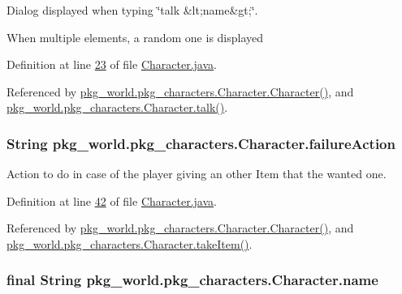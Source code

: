 Dialog displayed when typing \char`\"{}talk \&lt;name\&gt;\char`\"{}. 

When multiple elements, a random one is displayed 

Definition at line \hyperlink{Character_8java_source_l00023}{23} of file \hyperlink{Character_8java_source}{Character.\-java}.



Referenced by \hyperlink{Character_8java_source_l00057}{pkg\-\_\-world.\-pkg\-\_\-characters.\-Character.\-Character()}, and \hyperlink{Character_8java_source_l00100}{pkg\-\_\-world.\-pkg\-\_\-characters.\-Character.\-talk()}.

\hypertarget{classpkg__world_1_1pkg__characters_1_1Character_add959e452ec866785ef0d48f054b13ab}{
\subsubsection[{failure\-Action}]{\setlength{\rightskip}{0pt plus 5cm}String pkg\-\_\-world.\-pkg\-\_\-characters.\-Character.\-failure\-Action\hspace{0.3cm}{\ttfamily [private]}}}\label{classpkg__world_1_1pkg__characters_1_1Character_add959e452ec866785ef0d48f054b13ab}


Action to do in case of the player giving an other Item that the wanted one. 



Definition at line \hyperlink{Character_8java_source_l00042}{42} of file \hyperlink{Character_8java_source}{Character.\-java}.



Referenced by \hyperlink{Character_8java_source_l00081}{pkg\-\_\-world.\-pkg\-\_\-characters.\-Character.\-Character()}, and \hyperlink{Character_8java_source_l00108}{pkg\-\_\-world.\-pkg\-\_\-characters.\-Character.\-take\-Item()}.

\hypertarget{classpkg__world_1_1pkg__characters_1_1Character_a54831aae75fcaacb68cb500a12ffe457}{
\subsubsection[{name}]{\setlength{\rightskip}{0pt plus 5cm}final String pkg\-\_\-world.\-pkg\-\_\-characters.\-Character.\-name\hspace{0.3cm}{\ttfamily [private]}}}\label{classpkg__world_1_1pkg__characters_1_1Character_a54831aae75fcaacb68cb500a12ffe457}


